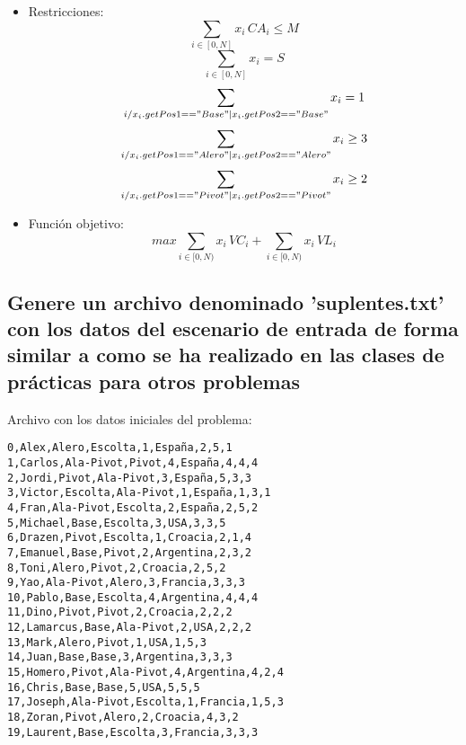 \documentclass[a4paper,12pt]{article}
\begin{document}
\begin{itemize}
\item Restricciones:\\
\setcounter{equation}{0}
\begin{equation}
 \sum_{i \in [0,N]}{x_i \, CA_i} \leq M
\end{equation}
 \begin{equation}
 \sum_{i \in [0,N]}{x_i} = S
\end{equation}
\begin{equation}
 \sum_{i / x_i.getPos1=="Base" | x_i.getPos2=="Base"}{x_i} = 1
\end{equation}
\begin{equation}
 \sum_{i / x_i.getPos1=="Alero" | x_i.getPos2=="Alero"}{x_i} \geq 3
\end{equation}
\begin{equation}
 \sum_{i / x_i.getPos1=="Pivot" | x_i.getPos2=="Pivot"}{x_i} \geq 2
\end{equation}
\item{Función objetivo:}
\begin{equation*}
max  \sum_{i \in [0,N)}{x_i \, VC_i}+\sum_{i \in [0,N)}{x_i \, VL_i}
\end{equation*}
\end{itemize}


\subsection{Genere un archivo denominado 'suplentes.txt' con los datos del escenario de entrada
de forma similar a como se ha realizado en las clases de prácticas para otros problemas}
Archivo con los datos iniciales del problema:

\begin{verbatim}
0,Alex,Alero,Escolta,1,España,2,5,1
1,Carlos,Ala-Pivot,Pivot,4,España,4,4,4
2,Jordi,Pivot,Ala-Pivot,3,España,5,3,3
3,Victor,Escolta,Ala-Pivot,1,España,1,3,1
4,Fran,Ala-Pivot,Escolta,2,España,2,5,2
5,Michael,Base,Escolta,3,USA,3,3,5
6,Drazen,Pivot,Escolta,1,Croacia,2,1,4
7,Emanuel,Base,Pivot,2,Argentina,2,3,2
8,Toni,Alero,Pivot,2,Croacia,2,5,2
9,Yao,Ala-Pivot,Alero,3,Francia,3,3,3
10,Pablo,Base,Escolta,4,Argentina,4,4,4
11,Dino,Pivot,Pivot,2,Croacia,2,2,2
12,Lamarcus,Base,Ala-Pivot,2,USA,2,2,2
13,Mark,Alero,Pivot,1,USA,1,5,3
14,Juan,Base,Base,3,Argentina,3,3,3
15,Homero,Pivot,Ala-Pivot,4,Argentina,4,2,4
16,Chris,Base,Base,5,USA,5,5,5
17,Joseph,Ala-Pivot,Escolta,1,Francia,1,5,3
18,Zoran,Pivot,Alero,2,Croacia,4,3,2
19,Laurent,Base,Escolta,3,Francia,3,3,3
\end{verbatim}
\end{document}
